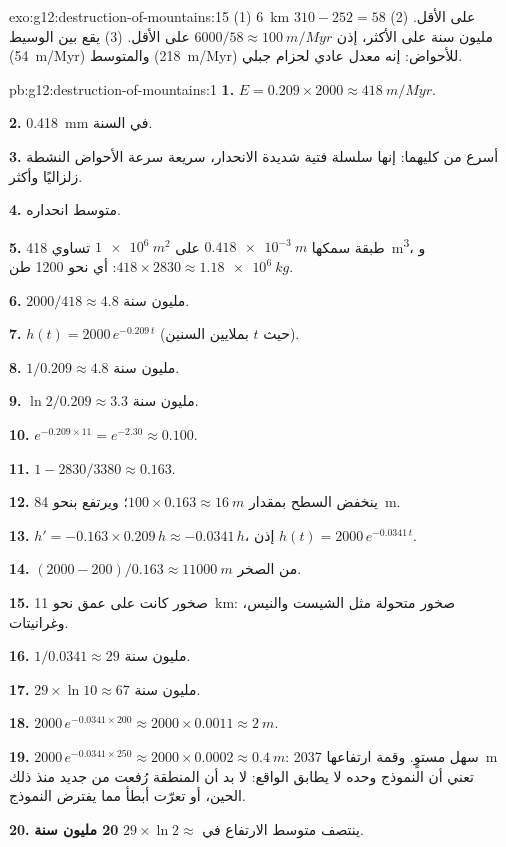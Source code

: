 \begin{solution}{exo:g12:destruction-of-mountains:15}
(1) \qty{6}{km} على الأقل. (2) $310 - 252 = 58$ مليون سنة على الأكثر، إذن
$6000/58 \approx \qty{100}{m/Myr}$ على الأقل. (3) يقع بين الوسيط
(\qty{54}{m/Myr}) والمتوسط (\qty{218}{m/Myr}) للأحواض: إنه معدل
عادي لحزام جبلي.
\end{solution}

\begin{solution}{pb:g12:destruction-of-mountains:1}
\textbf{1.} $E = 0.209 \times 2000 \approx \qty{418}{m/Myr}$.

\textbf{2.} \qty{0.418}{mm} في السنة.

\textbf{3.} أسرع من كليهما: إنها سلسلة فتية شديدة الانحدار، سريعة سرعة
الأحواض النشطة زلزاليًا وأكثر.

\textbf{4.} متوسط انحداره.

\textbf{5.} طبقة سمكها $\qty{0.418e-3}{m}$ على $\qty{1e6}{m^2}$ تساوي
\qty{418}{m^3}، و$418 \times 2830 \approx \qty{1.18e6}{kg}$: أي نحو 1200
طن.

\textbf{6.} $2000/418 \approx 4.8$ مليون سنة.

\textbf{7.} $h(t) = 2000\,e^{-0.209\,t}$ (حيث $t$ بملايين السنين).

\textbf{8.} $1/0.209 \approx 4.8$ مليون سنة.

\textbf{9.} $\ln 2/0.209 \approx 3.3$ مليون سنة.

\textbf{10.} $e^{-0.209 \times 11} = e^{-2.30} \approx 0.100$.

\textbf{11.} $1 - 2830/3380 \approx 0.163$.

\textbf{12.} ينخفض السطح بمقدار $100 \times 0.163 \approx \qty{16}{m}$؛
ويرتفع  بنحو \qty{84}{m}.

\textbf{13.} $h' = -0.163 \times 0.209\,h \approx -0.0341\,h$، إذن $h(t) =
2000\,e^{-0.0341\,t}$.

\textbf{14.} $(2000 - 200)/0.163 \approx \qty{11000}{m}$ من الصخر.

\textbf{15.} صخور كانت على عمق نحو \qty{11}{km}: صخور متحولة
مثل الشيست والنيس، وغرانيتات.

\textbf{16.} $1/0.0341 \approx 29$ مليون سنة.

\textbf{17.} $29 \times \ln 10 \approx 67$ مليون سنة.

\textbf{18.} $2000\,e^{-0.0341 \times 200} \approx 2000 \times 0.0011 \approx
\qty{2}{m}$.

\textbf{19.} $2000\,e^{-0.0341 \times 250} \approx 2000 \times 0.0002 \approx
\qty{0.4}{m}$: سهل مستوٍ. وقمة ارتفاعها \qty{2037}{m} تعني أن النموذج
وحده لا يطابق الواقع: لا بد أن المنطقة رُفعت من جديد منذ ذلك الحين، أو تعرّت
أبطأ مما يفترض النموذج.

\textbf{20.} ينتصف متوسط الارتفاع في $29 \times \ln 2 \approx$
\textbf{20 مليون سنة}.
\end{solution}
